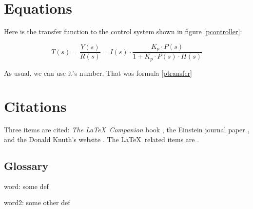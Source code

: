\documentclass[12pt]{article}
\begin{document}
	\section{Equations}

	Here is the transfer function to the control system shown in figure \ref{pcontroller}:

	\begin{equation}
	\label{ptransfer}
	T(s)=\frac{Y(s)}{R(s)}=I(s) \cdot \frac{K_p \cdot P(s)}{1 + K_p \cdot P(s) \cdot H(s)}
	\end{equation}

	As usual, we can use it's number. That was formula \eqref{ptransfer}

	\section{Citations}

	Three items are cited: \textit{The \LaTeX\ Companion} book \cite{latexcompanion}, the Einstein journal paper \cite{einstein}, and the Donald Knuth's website \cite{knuthwebsite}. The \LaTeX\ related items are \cite{latexcompanion,knuthwebsite}.

	\newpage
	\startappendixtitles
	\begin{appendices}

	\section{Glossary}
	\stopindent
	word: some def

	word2: some other def

	\startindent
	\end{appendices}
	\finishappendixtitles

\end{document}
